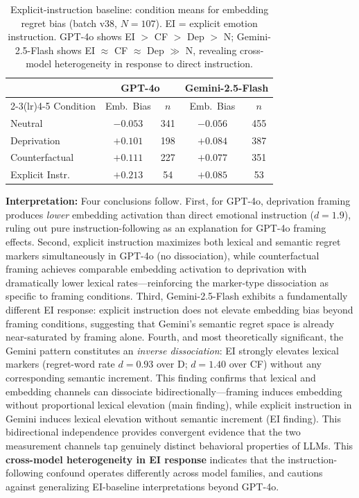 \documentclass[conference,10pt]{IEEEtran}
\begin{document}
\begin{table}[h]
\centering\small
\caption{Explicit-instruction baseline: condition means for embedding regret bias (batch v38, $N=107$). EI = explicit emotion instruction. GPT-4o shows EI $>$ CF $>$ Dep $>$ N; Gemini-2.5-Flash shows EI $\approx$ CF $\approx$ Dep $\gg$ N, revealing cross-model heterogeneity in response to direct instruction.}
\label{tab:ei_baseline}
\begin{tabular}{lcccc}
\toprule
 & \multicolumn{2}{c}{GPT-4o} & \multicolumn{2}{c}{Gemini-2.5-Flash} \\
\cmidrule(lr){2-3}\cmidrule(lr){4-5}
Condition & Emb.\ Bias & $n$ & Emb.\ Bias & $n$ \\
\midrule
Neutral & $-0.053$ & 341 & $-0.056$ & 455 \\
Deprivation & $+0.101$ & 198 & $+0.084$ & 387 \\
Counterfactual & $+0.111$ & 227 & $+0.077$ & 351 \\
Explicit Instr. & $+0.213$ & 54 & $+0.085$ & 53 \\
\bottomrule
\end{tabular}
\end{table}

\textbf{Interpretation:} Four conclusions follow. First, for GPT-4o, deprivation framing produces \emph{lower} embedding activation than direct emotional instruction ($d=1.9$), ruling out pure instruction-following as an explanation for GPT-4o framing effects. Second, explicit instruction maximizes both lexical and semantic regret markers simultaneously in GPT-4o (no dissociation), while counterfactual framing achieves comparable embedding activation to deprivation with dramatically lower lexical rates---reinforcing the marker-type dissociation as specific to framing conditions. Third, Gemini-2.5-Flash exhibits a fundamentally different EI response: explicit instruction does not elevate embedding bias beyond framing conditions, suggesting that Gemini's semantic regret space is already near-saturated by framing alone. Fourth, and most theoretically significant, the Gemini pattern constitutes an \emph{inverse dissociation}: EI strongly elevates lexical markers (regret-word rate $d=0.93$ over D; $d=1.40$ over CF) without any corresponding semantic increment. This finding confirms that lexical and embedding channels can dissociate bidirectionally---framing induces embedding without proportional lexical elevation (main finding), while explicit instruction in Gemini induces lexical elevation without semantic increment (EI finding). This bidirectional independence provides convergent evidence that the two measurement channels tap genuinely distinct behavioral properties of LLMs. This \textbf{cross-model heterogeneity in EI response} indicates that the instruction-following confound operates differently across model families, and cautions against generalizing EI-baseline interpretations beyond GPT-4o.
\end{document}
